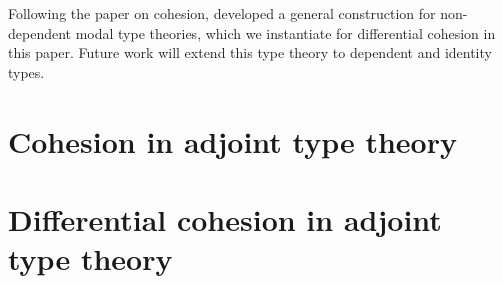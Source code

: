 \documentclass{article}
\begin{document}
Following the \citeyear{Licata2016} paper on cohesion, \citet{Licata2017}
developed a general construction for non-dependent modal type theories, which we
instantiate for differential cohesion in this paper. Future work will extend
this type theory to dependent and identity types.

\section{Cohesion in adjoint type theory}


\section{Differential cohesion in adjoint type theory}





\end{document}
